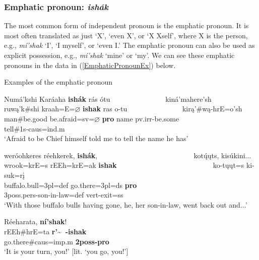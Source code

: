 \subsubsection{Emphatic pronoun: \textit{ishák}}\label{SubSubSecEmphaticPronoun}

The most common form of independent pronoun is the emphatic pronoun. It is most often translated as just `X', `even X', or `X Xself', where X is the person, e.g., \textit{mí'shak} `I', `I myself', or `even I.' The emphatic pronoun can also be used as explicit possession, e.g., \textit{mí'shak} `mine' or `my'. We can see these emphatic pronouns in the data in (\ref{EmphaticPronounEx}) below.

\begin{exe}

\item\label{EmphaticPronounEx} Examples of the emphatic pronoun

    \begin{xlist}
    
    \item\label{EmphaticPronounEx1} \glll Numá'kshi Karáaha \textbf{ishák} rás ótu ~ ~ ~ ~ ~ ~ ~ ~ ~ kiná'mahere'sh\\
    ruwą'k\#shi kraah=E=$\varnothing$ \textbf{ishak} ras o-tu ~ ~ ~ ~ ~ ~ ~ ~ ~ kirą'\#wą-hrE=o'sh\\
    \textnormal{man}\#\textnormal{be.good} \textnormal{be.afraid}=sv=$\varnothing$ \textbf{pro} \textnormal{name} pv.irr-\textnormal{be.some} ~ ~ ~ ~ ~ ~ ~ ~ ~ \textnormal{tell}\#1s-caus=ind.m\\
    \glt `Afraid to be Chief himself told me to tell the name he has' \citep[64]{hollow1973a}
    
    \item\label{EmphaticPronounEx2} \glll weróohkeres réehkerek, \textbf{ishák}, ~ ~ ~ ~ ~ ~ ~ ~ ~ ~ ~ ~ ~ ~ ~ ~ kotų́ųts, kisúkini...\\
    wrook=krE=s rEEh=krE=ak \textbf{ishak} ~ ~ ~ ~ ~ ~ ~ ~ ~ ~ ~ ~ ~ ~ ~ ~  ko-tųųt=s ki-suk=rį\\
    \textnormal{buffalo.bull}=3pl=def \textnormal{go.there}=3pl=ds \textbf{pro} ~ ~ ~ ~ ~ ~ ~ ~ ~ ~ ~ ~ ~ ~ ~ ~ 3poss.pers-\textnormal{son-in-law}=def vert-\textnormal{exit}=ss\\
    \glt `With those buffalo bulls having gone, he, her son-in-law, went back out and...' \citep[119]{hollow1973a}
    
    \item\label{EmphaticPronounEx3} \glll Réeharata, \textbf{ní'shak}!\\
    rEEh\#hrE=ta \textbf{r'\~~-ishak}\\
    \textnormal{go.there}\#caus=imp.m \textbf{2poss-pro}\\
    \glt `It is your turn, you!' [lit. `you go, you!'] \citep[160]{hollow1973a}
    

\end{xlist}
\end{exe}
